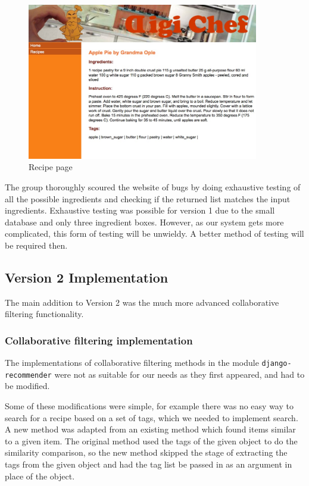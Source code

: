 \begin{figure}
\includegraphics[width=0.9\textwidth]{result_3}
\caption{Recipe page}
\label{fig:result_3}
\end{figure}

The group thoroughly scoured the website of bugs by doing exhaustive testing of all the possible ingredients and checking if the returned list matches the input ingredients. Exhaustive testing was possible for version 1 due to the small database and only three ingredient boxes. However, as our system gets more complicated, this form of testing will be unwieldy. A better method of testing will be required then.


\subsection{Version 2 Implementation}

The main addition to Version 2 was the much more advanced collaborative filtering functionality.

\subsubsection{Collaborative filtering implementation}

The implementations of collaborative filtering methods in the module \texttt{django-recommender} were not as suitable for our needs as they first appeared, and had to be modified.

Some of these modifications were simple, for example there was no easy way to search for a recipe based on a set of tags, which we needed to implement search. A new method was adapted from an existing method which found items similar to a given item. The original method used the tags of the given object to do the similarity comparison, so the new method skipped the stage of extracting the tags from the given object and had the tag list be passed in as an argument in place of the object.


